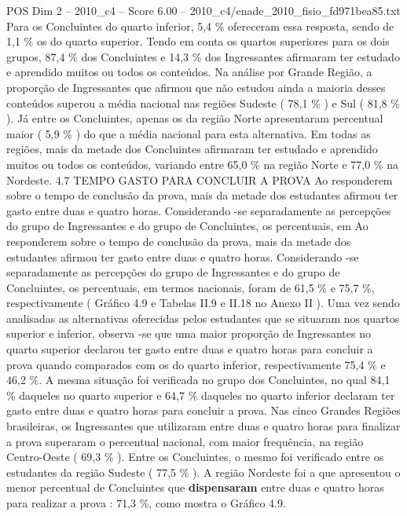 \begin{textsample}{POS Dim 2 – 2010\_c4 – Score 6.00 – 2010\_c4/enade\_2010\_fisio\_fd971bea85.txt}
Para os Concluintes do quarto inferior, 5,4 \% ofereceram essa resposta, sendo de 1,1 \% os do quarto superior.
Tendo em conta os quartos superiores para os dois grupos, 87,4 \% dos Concluintes e 14,3 \% dos Ingressantes afirmaram ter estudado e aprendido muitos ou todos os conteúdos.
Na análise por Grande Região, a proporção de Ingressantes que afirmou que não estudou ainda a maioria desses conteúdos superou a média nacional nas regiões Sudeste ( 78,1 \% ) e Sul ( 81,8 \% ).
Já entre os Concluintes, apenas os da região Norte apresentaram percentual maior ( 5,9 \% ) do que a média nacional para esta alternativa.
Em todas as regiões, mais da metade dos Concluintes afirmaram ter estudado e aprendido muitos ou todos os conteúdos, variando entre 65,0 \% na região Norte e 77,0 \% na Nordeste. 4.7 TEMPO GASTO PARA CONCLUIR A PROVA Ao responderem sobre o tempo de conclusão da prova, mais da metade dos estudantes afirmou ter gasto entre duas e quatro horas.
Considerando -se separadamente as percepções do grupo de Ingressantes e do grupo de Concluintes, os percentuais, em Ao responderem sobre o tempo de conclusão da prova, mais da metade dos estudantes afirmou ter gasto entre duas e quatro horas.
Considerando -se separadamente as percepções do grupo de Ingressantes e do grupo de Concluintes, os percentuais, em termos nacionais, foram de 61,5 \% e 75,7 \%, respectivamente ( Gráfico 4.9 e Tabelas II.9 e II.18 no Anexo II ).
Uma vez sendo analisadas as alternativas oferecidas pelos estudantes que se situaram nos quartos superior e inferior, observa -se que uma maior proporção de Ingressantes no quarto superior declarou ter gasto entre duas e quatro horas para concluir a prova quando comparados com os do quarto inferior, respectivamente 75,4 \% e 46,2 \%.
A mesma situação foi verificada no grupo dos Concluintes, no qual 84,1 \% daqueles no quarto superior e 64,7 \% daqueles no quarto inferior declaram ter gasto entre duas e quatro horas para concluir a prova.
Nas cinco Grandes Regiões brasileiras, os Ingressantes que utilizaram entre duas e quatro horas para finalizar a prova superaram o percentual nacional, com maior frequência, na região Centro-Oeste ( 69,3 \% ).
Entre os Concluintes, o mesmo foi verificado entre os estudantes da região Sudeste ( 77,5 \% ).
A região Nordeste foi a que apresentou o menor percentual de Concluintes que \textbf{dispensaram} entre duas e quatro horas para realizar a prova : 71,3 \%, como mostra o Gráfico 4.9.

\end{textsample}
